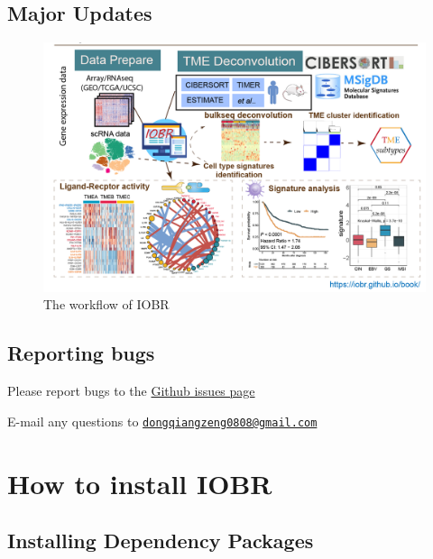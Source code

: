 \documentclass[
  12pt,
]{book}
\begin{document}
\hypertarget{major-updates}{%
\section{Major Updates}\label{major-updates}}

\begin{figure}

{\centering \includegraphics[width=0.95\linewidth]{./fig/IOBR-Workflow2} 

}

\caption{The workflow of IOBR}\label{fig:unnamed-chunk-2}
\end{figure}

\hypertarget{reporting-bugs}{%
\section{Reporting bugs}\label{reporting-bugs}}

Please report bugs to the \href{https://github.com/IOBR/IOBR/issues}{Github issues page}

E-mail any questions to \href{mailto:dongqiangzeng0808@gmail.com}{\nolinkurl{dongqiangzeng0808@gmail.com}}

\hypertarget{how-to-install-iobr}{%
\chapter{\texorpdfstring{\textbf{How to install IOBR}}{How to install IOBR}}\label{how-to-install-iobr}}

\hypertarget{installing-dependency-packages}{%
\section{Installing Dependency Packages}\label{installing-dependency-packages}}
\end{document}
